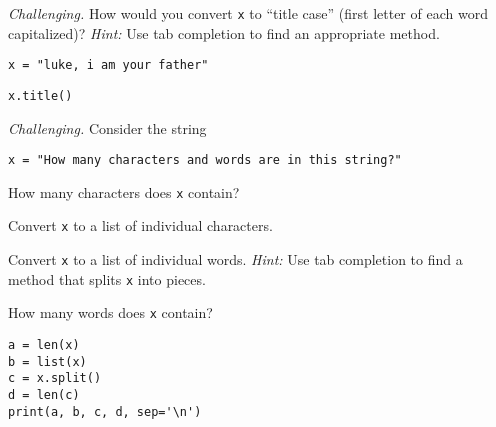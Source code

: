 \documentclass[11pt]{exam}
\begin{document}
\begin{questions}
\item {\it Challenging.\/}
How would you convert \texttt{x} to ``title case'' (first letter of each word capitalized)?
{\it Hint:\/} Use tab completion to find an appropriate method.
\begin{verbatim}
x = "luke, i am your father"
\end{verbatim}

\begin{solution}
\verb$x.title()$
\end{solution}

\item {\it Challenging.\/} Consider the string
\begin{verbatim}
x = "How many characters and words are in this string?"
\end{verbatim}
\begin{parts}
\item How many characters does \texttt{x} contain?
\item Convert \texttt{x} to a list of individual characters.
\item Convert \texttt{x} to a list of individual words.
{\it Hint:\/}  Use tab completion to find a method that splits \texttt{x}
into pieces.
\item How many words does \texttt{x} contain?
\end{parts}

\begin{solution}
\begin{verbatim}
a = len(x)
b = list(x)
c = x.split()
d = len(c)
print(a, b, c, d, sep='\n')
\end{verbatim}
\end{solution}






%

\end{questions}


\end{document}
